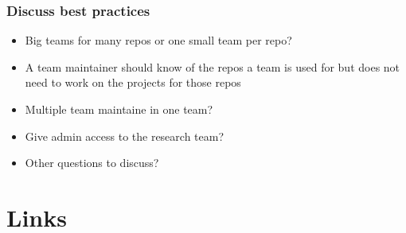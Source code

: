 \documentclass[aspectratio=169]{beamer} %
\begin{document}
\begin{frame}
	\frametitle{Discuss best practices}
	
	\begin{itemize}
		\item Big teams for many repos or one small team per repo?
		\item A team maintainer should know of the repos a team is used for but does not need to work on the projects for those repos
		\item Multiple team maintaine in one team?
		\item Give admin access to the research team?
		\item Other questions to discuss?
	\end{itemize}
	
\end{frame}


\section{Links}




\end{document}
